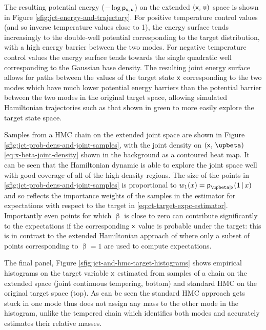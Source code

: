 The resulting potential energy ($-\log\mathsf{p}_{\mathsf{x},\,\mathsf{u}}$) on the extended $(\mathsf{x},\,\mathsf{u})$ space is shown in Figure \ref{sfig:jct-energy-and-trajectory}. For positive temperature control values (and so inverse temperature values close to 1), the energy surface tends increasingly to the double-well potential corresponding to the target distribution, with a high energy barrier between the two modes. For negative temperature control values the energy surface tends towards the single quadratic well corresponding to the Gaussian base density. The resulting joint energy surface allows for paths between the values of the target state $\mathsf{x}$ corresponding to the two modes which have much lower potential energy barriers than the potential barrier between the two modes in the original target space, allowing simulated Hamiltonian trajectories such as that shown in green to more easily explore the target state space. 

Samples from a \ac{HMC} chain on the extended joint space are shown in Figure \ref{sfig:jct-prob-dens-and-joint-samples}, with the joint density on $(\rvar{x},\,\upbeta)$ \eqref{eq:x-beta-joint-density} shown in the background as a contoured heat map. It can be seen that the Hamiltonian dynamic is able to explore the joint space well with good coverage of all of the high density regions. The size of the points in \ref{sfig:jct-prob-dens-and-joint-samples} is proportional to $w_1(x) = \pden{\upbeta|\rvar{x}}(1\gvn x)$ and so reflects the importance weights of the samples in the estimator for expectations with respect to the target in \eqref{eq:ct-target-expc-estimator}. Importantly even points for which $\upbeta$ is close to zero can contribute significantly to the expectations if the corresponding $\mathsf{x}$ value is probable under the target: this is in contrast to the extended Hamiltonian approach of \citep{gobbo2015extended} where only a subset of points corresponding to $\upbeta=1$ are used to compute expectations.

The final panel, Figure \ref{sfig:jct-and-hmc-target-histograms} shows empirical histograms on the target variable $\mathsf{x}$ estimated from samples of a chain on the extended space (joint continuous tempering, bottom) and standard \ac{HMC} on the original target space (top). As can be seen the standard \ac{HMC} approach gets stuck in one mode thus does not assign any mass to the other mode in the histogram, unlike the tempered chain which identifies both modes and accurately estimates their relative masses.

